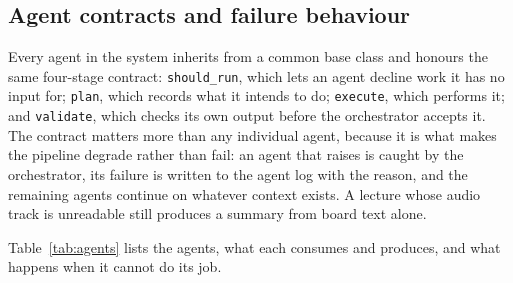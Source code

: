 \subsection{Agent contracts and failure behaviour}
\label{sec:meth-contracts}

Every agent in the system inherits from a common base class and honours the same
four-stage contract: \texttt{should\_run}, which lets an agent decline work it
has no input for; \texttt{plan}, which records what it intends to do;
\texttt{execute}, which performs it; and \texttt{validate}, which checks its own
output before the orchestrator accepts it. The contract matters more than any
individual agent, because it is what makes the pipeline degrade rather than
fail: an agent that raises is caught by the orchestrator, its failure is written
to the agent log with the reason, and the remaining agents continue on whatever
context exists. A lecture whose audio track is unreadable still produces a
summary from board text alone.

Table~\ref{tab:agents} lists the agents, what each consumes and produces, and
what happens when it cannot do its job.

